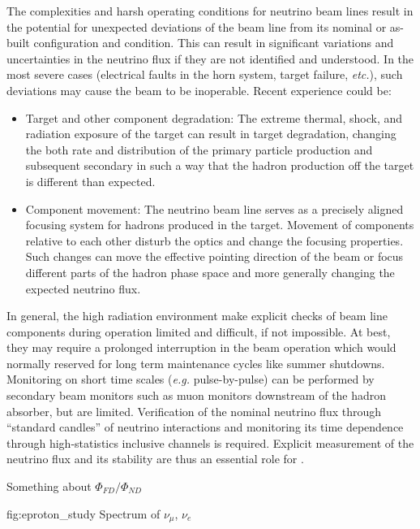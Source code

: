 The complexities and harsh operating conditions for neutrino beam lines result in the potential for unexpected deviations of the beam line from its nominal or as-built configuration and condition. This can result in significant variations and uncertainties in the neutrino flux if they are not identified and understood. In the most severe cases (electrical faults in the horn system, target failure, {\em etc.}), such deviations may cause the beam to be inoperable. Recent experience could be:
\begin{itemize}
    \item Target and other component degradation: The extreme thermal, shock, and radiation exposure of the target can result in target degradation, changing the both rate and distribution of the primary particle production and subsequent secondary in such a way that the hadron production off the target is different than expected.
    \item Component movement: The neutrino beam line serves as a precisely aligned focusing system for hadrons produced in the target. Movement of components relative to each other disturb the optics and change the focusing properties. Such changes can move the effective pointing direction of the beam or focus different parts of the hadron phase space and more generally changing the expected neutrino flux. 
\end{itemize}
In general, the high radiation environment make explicit checks of beam line components during operation limited and difficult, if not impossible. At best, they may require a prolonged interruption in the beam operation which would normally reserved for long term maintenance cycles like summer shutdowns. Monitoring on short time scales ({\em e.g.} pulse-by-pulse) can be performed by secondary beam monitors such as muon monitors downstream of the hadron absorber, but are limited. Verification of the nominal neutrino flux through ``standard candles'' of neutrino interactions and monitoring its time dependence through high-statistics inclusive channels is required. Explicit measurement of the neutrino flux and its stability are thus an essential role for . 

Something about $\Phi_{FD}/\Phi_{ND}$

\begin{dunefigure}[$\nu_\mu$,$\nu_e$ at \dword{nd}]{fig:eproton_study}
{Spectrum of $\nu_\mu$, $\nu_e$}
\end{dunefigure}





